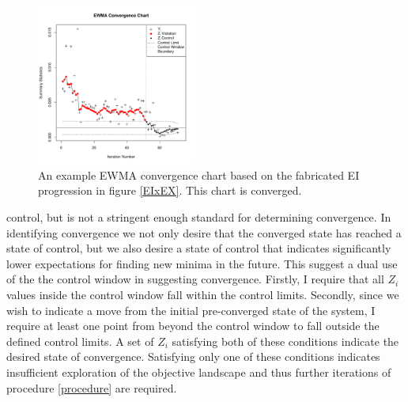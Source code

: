 \documentclass[12pt]{article}
\begin{document}
	\begin{figure}
	\vspace{-1.1cm}
	\begin{center}
	\includegraphics[width=0.47\textwidth]{./figures/exampleEWMA.pdf}
	\end{center}
	\vspace{-0.85cm}
	\caption{An example EWMA convergence chart based on the fabricated EI progression in figure \ref{EIxEX}. This chart is converged.}%
	\label{EXconverge}
	\end{figure}

	\noindent control, but is not a stringent enough standard for determining convergence.
	In identifying convergence we not only desire that the converged state has reached a state of control, but we also desire a state of control that indicates significantly lower expectations for finding new minima in the future.
	This suggest a dual use of the the control window in suggesting convergence.
	Firstly, I require that all $Z_i$ values inside the control window fall within the control limits. 
	Secondly, since we wish to indicate a move from the initial pre-converged state of the system, I require at least one point from beyond the control window to fall outside the defined control limits.
	A set of $Z_i$ satisfying both of these conditions indicate the desired state of convergence.
	Satisfying only one of these conditions indicates insufficient exploration of the objective landscape and thus further iterations of procedure \ref{procedure} are required.
	
\end{document}
